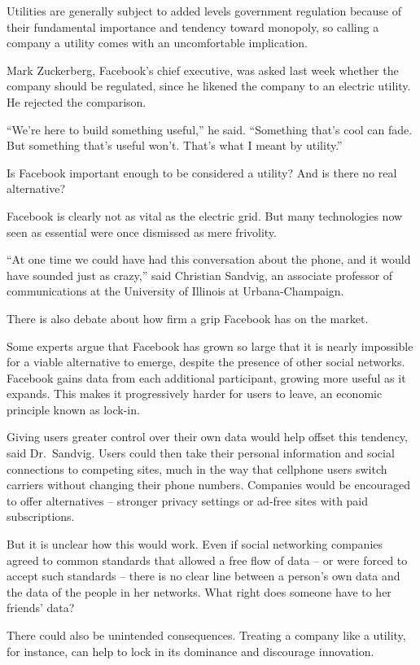 ﻿\documentclass[12pt]{article}
\begin{document}
Utilities are generally subject to added levels government regulation because of their fundamental
importance and tendency toward monopoly, so calling a company a utility comes with an uncomfortable
implication.

Mark Zuckerberg, Facebook's chief executive, was asked last week whether the company should be
regulated, since he likened the company to an electric utility. He rejected the comparison.

``We're here to build something useful,'' he said. ``Something that's cool can fade. But something
that's useful won't. That's what I meant by utility.''

Is Facebook important enough to be considered a utility? And is there no real alternative?

Facebook is clearly not as vital as the electric grid. But many technologies now seen as essential
were once dismissed as mere frivolity.

``At one time we could have had this conversation about the phone, and it would have sounded just as
crazy,'' said Christian Sandvig, an associate professor of communications at the University of
Illinois at Urbana-Champaign.

There is also debate about how firm a grip Facebook has on the market.

Some experts argue that Facebook has grown so large that it is nearly impossible for a viable
alternative to emerge, despite the presence of other social networks. Facebook gains data from each
additional participant, growing more useful as it expands. This makes it progressively harder for
users to leave, an economic principle known as lock-in.

Giving users greater control over their own data would help offset this tendency, said Dr.~Sandvig.
Users could then take their personal information and social connections to competing sites, much in
the way that cellphone users switch carriers without changing their phone numbers. Companies would
be encouraged to offer alternatives -- stronger privacy settings or ad-free sites with paid
subscriptions.

But it is unclear how this would work. Even if social networking companies agreed to common
standards that allowed a free flow of data -- or were forced to accept such standards -- there is no
clear line between a person's own data and the data of the people in her networks. What right does
someone have to her friends' data?

There could also be unintended consequences. Treating a company like a utility, for instance, can
help to lock in its dominance and discourage innovation.
\end{document}
